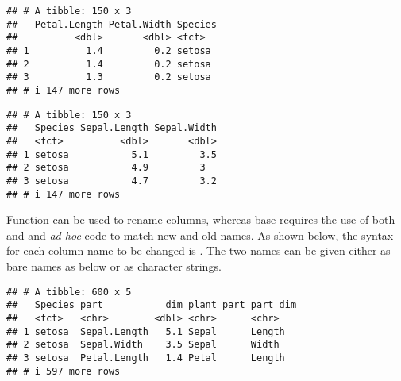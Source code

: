 \documentclass[krantz2]{krantz}\usepackage{knitr}
\begin{document}
\begin{knitrout}\footnotesize
{}\color{fgcolor}\begin{kframe}
\begin{alltt}
 \hlopt{-}\hlstd{(}\hlstd{))}
\end{alltt}
\begin{verbatim}
## # A tibble: 150 x 3
##   Petal.Length Petal.Width Species
##          <dbl>       <dbl> <fct>  
## 1          1.4         0.2 setosa 
## 2          1.4         0.2 setosa 
## 3          1.3         0.2 setosa 
## # i 147 more rows
\end{verbatim}
\end{kframe}
\end{knitrout}

\begin{knitrout}\footnotesize
{}\color{fgcolor}\begin{kframe}
\begin{alltt}
 \hlstd{(}\hlstd{))}
\end{alltt}
\begin{verbatim}
## # A tibble: 150 x 3
##   Species Sepal.Length Sepal.Width
##   <fct>          <dbl>       <dbl>
## 1 setosa           5.1         3.5
## 2 setosa           4.9         3  
## 3 setosa           4.7         3.2
## # i 147 more rows
\end{verbatim}
\end{kframe}
\end{knitrout}

Function  can be used to rename columns, whereas base \Rlang requires the use of both  and  and \emph{ad hoc} code to match new and old names. As shown below, the syntax for each column name to be changed is . The two names can be given either as bare names as below or as character strings.

\begin{knitrout}\footnotesize
{}\color{fgcolor}\begin{kframe}
\begin{alltt}
  
\end{alltt}
\begin{verbatim}
## # A tibble: 600 x 5
##   Species part           dim plant_part part_dim
##   <fct>   <chr>        <dbl> <chr>      <chr>   
## 1 setosa  Sepal.Length   5.1 Sepal      Length  
## 2 setosa  Sepal.Width    3.5 Sepal      Width   
## 3 setosa  Petal.Length   1.4 Petal      Length  
## # i 597 more rows
\end{verbatim}
\end{kframe}
\end{knitrout}
\end{document}
